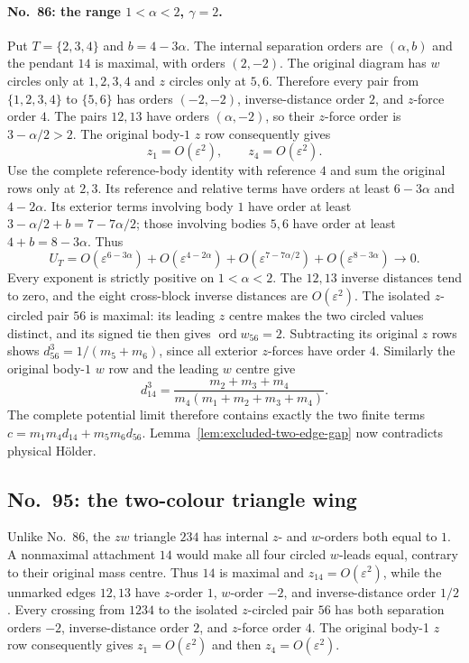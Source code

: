 \documentclass[11pt]{amsart}
\theoremstyle{remark}
\newcommand{\ord}{\operatorname{ord}}
\begin{document}
\paragraph{No.~86: the range $1<\alpha<2$, $\gamma=2$.}
Put $T=\{2,3,4\}$ and $b=4-3\alpha$.
The internal separation orders are $(\alpha,b)$ and the pendant $14$ is maximal, with orders $(2,-2)$.
The original diagram has $w$ circles only at $1,2,3,4$ and $z$ circles only at $5,6$.
Therefore every pair from $\{1,2,3,4\}$ to $\{5,6\}$ has orders $(-2,-2)$, inverse-distance order $2$, and $z$-force order $4$.
The pairs $12,13$ have orders $(\alpha,-2)$, so their $z$-force order is $3-\alpha/2>2$.
The original body-$1$ $z$ row consequently gives
\[
 z_1=O(\varepsilon^2),\qquad z_4=O(\varepsilon^2).
\]
Use the complete reference-body identity with reference $4$ and sum the original rows only at $2,3$.
Its reference and relative terms have orders at least $6-3\alpha$ and $4-2\alpha$.
Its exterior terms involving body $1$ have order at least
$3-\alpha/2+b=7-7\alpha/2$; those involving bodies $5,6$ have order at least $4+b=8-3\alpha$.
Thus
\begin{equation}\label{eq:no86-complete-potential}
 U_T=O(\varepsilon^{6-3\alpha})
     +O(\varepsilon^{4-2\alpha})
     +O(\varepsilon^{7-7\alpha/2})
     +O(\varepsilon^{8-3\alpha})\longrightarrow0.
\end{equation}
Every exponent is strictly positive on $1<\alpha<2$.
The $12,13$ inverse distances tend to zero, and the eight cross-block inverse distances are $O(\varepsilon^2)$.
The isolated $z$-circled pair $56$ is maximal: its leading $z$ centre makes the two circled values distinct, and its signed tie then gives $\ord w_{56}=2$.
Subtracting its original $z$ rows shows $d_{56}^3=1/(m_5+m_6)$, since all exterior $z$-forces have order $4$.
Similarly the original body-$1$ $w$ row and the leading $w$ centre give
\[
 d_{14}^3=\frac{m_2+m_3+m_4}{m_4(m_1+m_2+m_3+m_4)}.
\]
The complete potential limit therefore contains exactly the two finite terms
$c=m_1m_4d_{14}+m_5m_6d_{56}$.
Lemma~\ref{lem:excluded-two-edge-gap} now contradicts physical H\"older.

\subsection{No.~95: the two-colour triangle wing}\label{sec:no95-wing}
Unlike No.~86, the $zw$ triangle $234$ has internal $z$- and $w$-orders both equal to $1$. A nonmaximal attachment $14$ would make all four circled $w$-leads equal, contrary to their original mass centre. Thus $14$ is maximal and $z_{14}=O(\varepsilon^2)$, while the unmarked edges $12,13$ have $z$-order $1$, $w$-order $-2$, and inverse-distance order $1/2$. Every crossing from $1234$ to the isolated $z$-circled pair $56$ has both separation orders $-2$, inverse-distance order $2$, and $z$-force order $4$. The original body-1 $z$ row consequently gives $z_1=O(\varepsilon^2)$ and then $z_4=O(\varepsilon^2)$.
\end{document}
